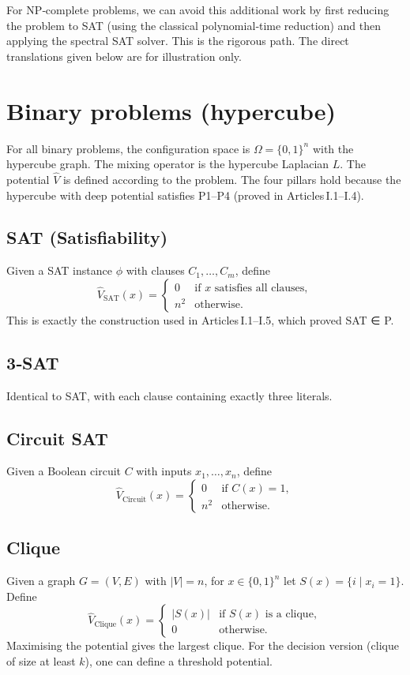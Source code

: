 \documentclass[11pt,a4paper]{article}
\begin{document}
For NP‑complete problems, we can avoid this additional work by first reducing the problem to SAT (using the classical polynomial‑time reduction) and then applying the spectral SAT solver. This is the rigorous path. The direct translations given below are for illustration only.

\section{Binary problems (hypercube)}

For all binary problems, the configuration space is $\Omega = \{0,1\}^n$ with the hypercube graph. The mixing operator is the hypercube Laplacian $L$. The potential $\hat{V}$ is defined according to the problem. The four pillars hold because the hypercube with deep potential satisfies P1–P4 (proved in Articles I.1–I.4).

\subsection{SAT (Satisfiability)}
Given a SAT instance $\phi$ with clauses $C_1,\ldots,C_m$, define
\[
\hat{V}_{\mathrm{SAT}}(x) = \begin{cases}
0 & \text{if } x \text{ satisfies all clauses},\\
n^2 & \text{otherwise}.
\end{cases}
\]
This is exactly the construction used in Articles I.1–I.5, which proved SAT ∈ P.

\subsection{3‑SAT}
Identical to SAT, with each clause containing exactly three literals.

\subsection{Circuit SAT}
Given a Boolean circuit $C$ with inputs $x_1,\ldots,x_n$, define
\[
\hat{V}_{\mathrm{Circuit}}(x) = \begin{cases}
0 & \text{if } C(x)=1,\\
n^2 & \text{otherwise}.
\end{cases}
\]

\subsection{Clique}
Given a graph $G = (V,E)$ with $|V| = n$, for $x\in\{0,1\}^n$ let $S(x) = \{i\mid x_i=1\}$. Define
\[
\hat{V}_{\mathrm{Clique}}(x) = \begin{cases}
|S(x)| & \text{if } S(x) \text{ is a clique},\\
0 & \text{otherwise}.
\end{cases}
\]
Maximising the potential gives the largest clique. For the decision version (clique of size at least $k$), one can define a threshold potential.
\end{document}
